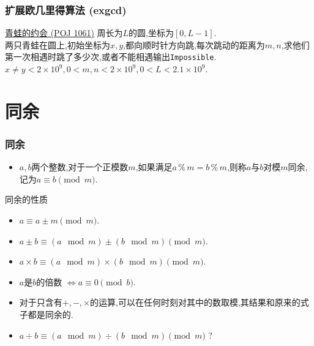 \documentclass{beamer}
\newcommand{\pau}{}
\begin{document}
\begin{frame}[fragile]
    \frametitle{扩展欧几里得算法 (exgcd)}
    \begin{exampleblock}{\href{http://poj.org/problem?id=1061}{青蛙的约会 (POJ 1061)}}
        周长为$L$的圆,坐标为$[0,L-1]$.\\
        两只青蛙在圆上,初始坐标为$x,y$,都向顺时针方向跳,每次跳动的距离为$m,n$,求他们第一次相遇时跳了多少次,或者不能相遇输出\texttt{Impossible}.\\
        $x\neq y<2\times10^9,0<m,n<2\times10^9,0<L<2.1\times10^9$.
    \end{exampleblock}
\end{frame}

\section{同余}
\begin{frame}[fragile]
    \frametitle{同余}
    \begin{itemize}
        \item $a,b$两个整数,对于一个正模数$m$,如果满足$a\,\%\,m=b\,\%\,m$,则称$a$与$b$对模$m$同余,记为$a\equiv b\pmod m$.
    \end{itemize}\pau
    \begin{block}{同余的性质}
        \begin{itemize}\pau
            \item $a\equiv a\pm m\pmod m$. \pau
            \item $a\pm b\equiv(a\mod m)\pm(b\mod m)\pmod m$. \pau
            \item $a\times b\equiv(a\mod m)\times(b\mod m)\pmod m$. \pau
            \item $a$是$b$的倍数 $\Leftrightarrow a\equiv0\pmod b$.
        \end{itemize}
    \end{block}\pau
    \begin{itemize}
        \item 对于只含有$+,-,\times$的运算,可以在任何时刻对其中的数取模,其结果和原来的式子都是同余的. \pau
        \item $a\div b\equiv(a\mod m)\div(b\mod m)\pmod m$ ?
    \end{itemize}
\end{frame}
\end{document}
